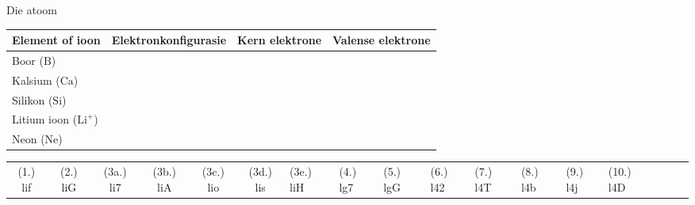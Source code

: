 \begin{eocexercises}{Die atoom}
\begin{enumerate}[noitemsep, label=\textbf{\arabic*}. ]
\begin{table}[H]
\begin{center}
    \noindent
      \begin{tabular}{|l|l|l|l|}\hline
        Element of ioon &
        Elektronkonfigurasie &
        Kern elektrone &
        Valense elektrone \\ \hline
        Boor ($\text{B}$) &
         &
         &
       \\ \hline
        Kalsium ($\text{Ca}$) &
         &
         &
     \\ \hline
        Silikon ($\text{Si}$) &
         &
         &
       \\ \hline
        Litium ioon ($\text{Li}^{+}$) &
         &
         &
      \\ \hline
        Neon ($\text{Ne}$) &
         &
         &
     \\ \hline
    \end{tabular}
      \end{center}
\end{table}
    \par
\end{enumerate}

\practiceinfo
\begin{tabular}[h]{cccccc}
 (1.) lif  &  (2.) liG  &  (3a.) li7  &  (3b.) liA  &  (3c.) lio  &  (3d.) lis  &  (3e.) liH  &  (4.) lg7  &  (5.) lgG  &  (6.) l42  &  (7.) l4T  &  (8.) l4b  &  (9.) l4j  &  (10.) l4D  &  & &  &
\end{tabular}

\end{eocexercises}
